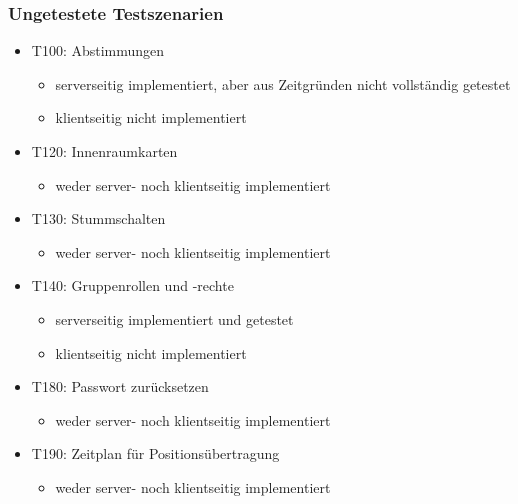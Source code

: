 \documentclass[parskip=full,11pt]{scrartcl}
\begin{document}
	\subsubsection{Ungetestete Testszenarien}
		\begin{itemize}
    	    \item T100: Abstimmungen\\
                \begin{itemize}
                \item serverseitig implementiert, aber aus Zeitgründen nicht
                    vollständig getestet
                \item klientseitig nicht implementiert
                \end{itemize}
			\item T120: Innenraumkarten\\
                \begin{itemize}
                \item weder server- noch klientseitig implementiert
                \end{itemize}
			\item T130: Stummschalten\\
                \begin{itemize}
                \item weder server- noch klientseitig implementiert
                \end{itemize}
			\item T140: Gruppenrollen und -rechte\\
                \begin{itemize}
                \item serverseitig implementiert und getestet
                \item klientseitig nicht implementiert
                \end{itemize}
			\item T180: Passwort zurücksetzen\\
                \begin{itemize}
                \item weder server- noch klientseitig implementiert
                \end{itemize}
			\item T190: Zeitplan für Positionsübertragung\\
                \begin{itemize}
                \item weder server- noch klientseitig implementiert
                \end{itemize}
		\end{itemize}
\end{document}
